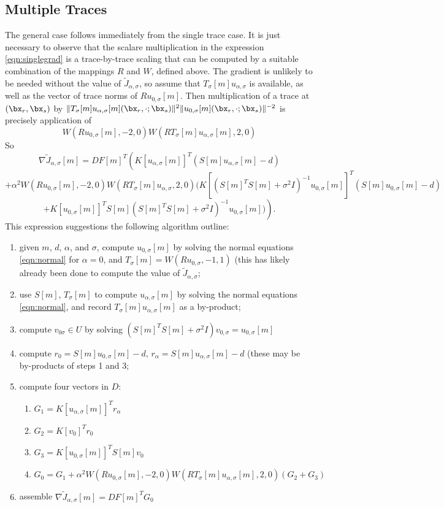 \subsection{Multiple Traces}
The general case follows immediately from the single trace case. It is
just necessary to observe that the scalare multiplication in the
expression \ref{eqn:singlegrad} is a trace-by-trace scaling that can
be computed by a suitable combination of the mappings $R$ and $W$,
defined above. The gradient is unlikely to be needed without the value
of $\tilde{J}_{\alpha,\sigma}$, so assume that
$T_{\sigma}[m]u_{\alpha,\sigma}$ is available, as well as the vector
of trace norms of $Ru_{0,\sigma}[m]$. Then multiplication of a trace
at $(\bx_r,\bx_s)$ by
$\|T_{\sigma}[m]u_{\alpha,\sigma}[m](\bx_r,\cdot;\bx_s)\|^2\|
u_{0,\sigma}[m](\bx_r,\cdot;\bx_s)\|^{-2}$ is precisely application of
\[
  W(Ru_{0,\sigma}[m],-2,0)W(RT_{\sigma}[m] u_{\alpha,\sigma}[m],2,0)
\]
So
\[
  \nabla \tilde{J}_{\alpha,\sigma}[m] = DF[m]^T\left( K[u_{\alpha,\sigma}[m]]^T(S[m]u_{\alpha,\sigma}[m]-d)\right.
\]
\[
  \left.  +\alpha^2 W(Ru_{0,\sigma}[m],-2,0)W(RT_{\sigma}[m]u_{\alpha,\sigma},2,0)
( K[(S[m]^TS[m] + \sigma^2I)^{-1}u_{0,\sigma}[m]]^T (S[m]u_{0,\sigma}[m]-d) \right.
\]
\begin{equation}
  \label{eqn:singlegrad}
\left.+K[u_{0,\sigma}[m]]^T S[m](S[m]^TS[m] + \sigma^2I)^{-1}u_{0,\sigma}[m])  \right).
\end{equation}
This expression suggestions the following algorithm outline:
\begin{enumerate}
\item given $m$, $d$, $\alpha$, and $\sigma$, compute
  $u_{0,\sigma}[m]$ by solving the normal equations \ref{eqn:normal}
  for $\alpha=0$, and $T_{\sigma}[m]=W(Ru_{0,\sigma},-1,1)$ (this has
  likely already been done to compute the value of $\tilde{J}_{\alpha,\sigma}$;
\item use $S[m]$, $T_{\sigma}[m]$ to compute $u_{\alpha,\sigma}[m]$ by
  solving the normal equations \ref{eqn:normal}, and record
  $T_{\sigma}[m]u_{\alpha,\sigma}[m]$ as a by-product;
\item compute $v_{0\sigma} \in U$ by solving $(S[m]^TS[m] + \sigma^2 I)v_{0,\sigma} = u_{0,\sigma}[m]$
\item compute $r_0 = S[m]u_{0,\sigma}[m]-d,\,r_{\alpha} = S[m]u_{\alpha,\sigma}[m]-d$ (these may be by-products of steps 1 and 3;
\item compute four vectors in $D$:
  \begin{enumerate}
  \item $G_1 = K[u_{\alpha,\sigma}[m]]^Tr_{\alpha}$
  \item $G_2 = K[v_0]^Tr_0$
  \item $G_3 = K[u_{0,\sigma}[m]]^TS[m]v_0$
  \item $G_0 = G_1 + \alpha^2  W(Ru_{0,\sigma}[m],-2,0)W(RT_{\sigma}[m]u_{\alpha,\sigma}[m],2,0) (G_2 + G_3)$
  \end{enumerate}
\item assemble
  $\nabla \tilde{J}_{\alpha,\sigma}[m] = DF[m]^TG_0$
\end{enumerate}

